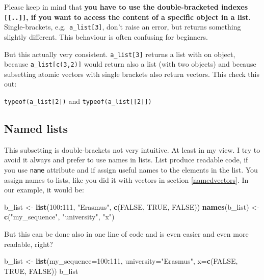\documentclass[
]{scrartcl}
\makeatletter
\newenvironment{Shaded}{\begin{snugshade}}{\end{snugshade}}
\newcommand{\DataTypeTok}[1]{\textcolor[rgb]{0.13,0.29,0.53}{#1}}
\newcommand{\DecValTok}[1]{\textcolor[rgb]{0.00,0.00,0.81}{#1}}
\newcommand{\KeywordTok}[1]{\textcolor[rgb]{0.13,0.29,0.53}{\textbf{#1}}}
\newcommand{\NormalTok}[1]{#1}
\newcommand{\OperatorTok}[1]{\textcolor[rgb]{0.81,0.36,0.00}{\textbf{#1}}}
\newcommand{\OtherTok}[1]{\textcolor[rgb]{0.56,0.35,0.01}{#1}}
\newcommand{\StringTok}[1]{\textcolor[rgb]{0.31,0.60,0.02}{#1}}
\newenvironment{kframe}{%
\medskip{}
\setlength{\fboxsep}{.8em}
 \def\at@end@of@kframe{}%
 \ifinner\ifhmode%
  \def\at@end@of@kframe{\end{minipage}}%
  \begin{minipage}{\columnwidth}%
 \fi\fi%
 \def\FrameCommand##1{\hskip\@totalleftmargin \hskip-\fboxsep
 \colorbox{shadecolor}{##1}\hskip-\fboxsep
     \hskip-\linewidth \hskip-\@totalleftmargin \hskip\columnwidth}%
 \MakeFramed {\advance\hsize-\width
   \@totalleftmargin\z@ \linewidth\hsize
   \@setminipage}}%
 {\par\unskip\endMakeFramed%
 \at@end@of@kframe}
\newenvironment{rmdblock}[1]
  {
  \begin{itemize}
  \renewcommand{\labelitemi}{
    \raisebox{-.7\height}[0pt][0pt]{
      {\setkeys{Gin}{width=3em,keepaspectratio}\texttt{[image: images/\#1]}}
    }
  }
  \setlength{\fboxsep}{1em}
  \begin{kframe}
  \item
  }
  {
  \end{kframe}
  \end{itemize}
  }
\newenvironment{geek}
    {\begin{rmdblock}{geek}}
    {\end{rmdblock}}
\makeatother
\begin{document}
Please keep in mind that \textbf{you have to use the double-bracketed indexes \texttt{{[}{[}..{]}{]}}, if you want to access the content of a specific object in a list}. Single-brackets, e.g.~\texttt{a\_list{[}3{]}}, don't raise an error, but returns something slightly different. This behaviour is often confusing for beginners.

\begin{geek}
But this actually very consistent. \texttt{a\_list{[}3{]}} returns a
list with on object, because \texttt{a\_list{[}c(3,2){]}} would return
also a list (with two objects) and because subsetting atomic vectors
with single brackets also return vectors. This check this out:

\texttt{typeof(a\_list{[}2{]})} and
\texttt{typeof(a\_list{[}{[}2{]}{]})}
\end{geek}

\hypertarget{namedlists}{%
\subsection{Named lists}\label{namedlists}}

This subsetting is double-brackets not very intuitive. At least in my view. I try to avoid it always and prefer to use names in lists. List produce readable code, if you use \texttt{name} attribute and if assign useful names to the elements in the list. You assign names to lists, like you did it with vectors in section \ref{namedvectors}. In our example, it would be:

\begin{Shaded}
\begin{Highlighting}[]
\NormalTok{b\_list \textless{}{-}}\StringTok{ }\KeywordTok{list}\NormalTok{(}\DecValTok{100}\OperatorTok{:}\DecValTok{111}\NormalTok{, }\StringTok{"Erasmus"}\NormalTok{, }\KeywordTok{c}\NormalTok{(}\OtherTok{FALSE}\NormalTok{, }\OtherTok{TRUE}\NormalTok{, }\OtherTok{FALSE}\NormalTok{))}
\KeywordTok{names}\NormalTok{(b\_list) \textless{}{-}}\StringTok{ }\KeywordTok{c}\NormalTok{(}\StringTok{"my\_sequence"}\NormalTok{, }\StringTok{"university"}\NormalTok{, }\StringTok{"x"}\NormalTok{)}
\end{Highlighting}
\end{Shaded}

But this can be done also in one line of code and is even easier and even more readable, right?

\begin{Shaded}
\begin{Highlighting}[]
\NormalTok{b\_list \textless{}{-}}\StringTok{ }\KeywordTok{list}\NormalTok{(}\DataTypeTok{my\_sequence=}\DecValTok{100}\OperatorTok{:}\DecValTok{111}\NormalTok{, }\DataTypeTok{university=}\StringTok{"Erasmus"}\NormalTok{, }\DataTypeTok{x=}\KeywordTok{c}\NormalTok{(}\OtherTok{FALSE}\NormalTok{, }\OtherTok{TRUE}\NormalTok{, }\OtherTok{FALSE}\NormalTok{))}
\NormalTok{b\_list}
\end{Highlighting}
\end{Shaded}
\end{document}
